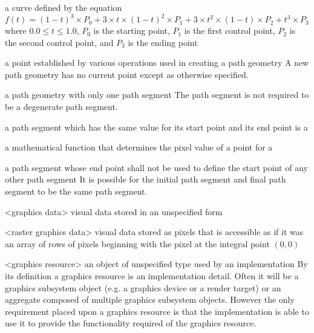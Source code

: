 a curve defined by the 
equation $f(t) = (1 - t)^{3} \times P_{0} + 3 \times t \times (1 - t)^{2} 
\times P_{1} + 3 \times t^{2} \times (1 - t) \times P_{2} + t^{3} \times P_{3}$ 
where $0.0 \le t \le 1.0$, $P_{0}$ is the starting point, $P_{1}$ is the first 
control point, $P_{2}$ is the second control point, and $P_{3}$ is the 
ending point

a point established by various operations used in creating a path geometry
\enternote
A new path geometry has no current point except as otherwise specified.
\exitnote

a path geometry with only one path segment
\enternote
The path segment is not required to be a degenerate path segment.
\exitnote

a path segment which has the same value for its start point and its end point is a 

a mathematical function that determines the pixel value of a point for a \pixmap

a path segment whose end point shall not be used to define the start point of any other path segment
\enternote
It is possible for the initial path segment and final path segment to be the same path segment.
\exitnote

<graphics data> visual data stored in an unspecified form

<raster graphics data> visual data stored as pixels that is accessible as if it was an array of rows of pixels beginning with the pixel at the integral point $(0,0)$

<graphics resource> an object of unspecified type used by an implementation
\enternote
By its definition a graphics resource is an implementation detail. Often it will be a graphics subsystem object (e.g. a graphics device or a render target) or an aggregate composed of multiple graphics subsystem objects. However the only requirement placed upon a graphics resource is that the implementation is able to use it to provide the functionality required of the graphics resource.
\exitnote

